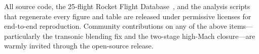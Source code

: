 All source code, the 25-flight Rocket Flight Database~\cite{rfd_zenodo}, and the
analysis scripts that regenerate every figure and table are released under
permissive licenses for end-to-end reproduction. Community contributions on any
of the above items---particularly the transonic blending fix and the two-stage
high-Mach closure---are warmly invited through the open-source release.

